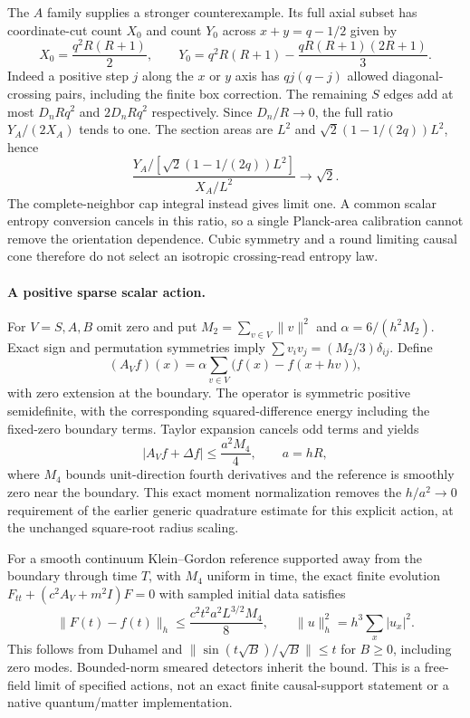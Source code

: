 The $A$ family supplies a stronger counterexample. Its full axial subset has
coordinate-cut count $X_0$ and count $Y_0$ across $x+y=q-1/2$ given by
\[
 X_0=\frac{q^2R(R+1)}2,\qquad
 Y_0=q^2R(R+1)-\frac{qR(R+1)(2R+1)}3.
\]
Indeed a positive step $j$ along the $x$ or $y$ axis has $qj(q-j)$ allowed
diagonal-crossing pairs, including the finite box correction. The remaining
$S$ edges add at most $D_nRq^2$ and $2D_nRq^2$ respectively. Since
$D_n/R\to0$, the full ratio $Y_A/(2X_A)$ tends to one. The section areas
are $L^2$ and $\sqrt2(1-1/(2q))L^2$, hence
\begin{equation}
 \frac{Y_A/[\sqrt2(1-1/(2q))L^2]}{X_A/L^2}\longrightarrow\sqrt2.
 \label{eq:m1-cut-anisotropy}
\end{equation}
The complete-neighbor cap integral instead gives limit one. A common scalar
entropy conversion cancels in this ratio, so a single Planck-area calibration
cannot remove the orientation dependence. Cubic symmetry and a round limiting
causal cone therefore do not select an isotropic crossing-read entropy law.

\paragraph{A positive sparse scalar action.}
For $V=S,A,B$ omit zero and put $M_2=\sum_{v\in V}\|v\|^2$ and
$\alpha=6/(h^2M_2)$. Exact sign and permutation symmetries imply
$\sum v_iv_j=(M_2/3)\delta_{ij}$. Define
\[
 (A_V f)(x)=\alpha\sum_{v\in V}\bigl(f(x)-f(x+hv)\bigr),
\]
with zero extension at the boundary. The operator is symmetric positive
semidefinite, with the corresponding squared-difference energy including
the fixed-zero boundary terms. Taylor expansion cancels odd terms and yields
\[
 |A_V f+\Delta f|\le\frac{a^2M_4}{4},\qquad a=hR,
\]
where $M_4$ bounds unit-direction fourth derivatives and the reference is
smoothly zero near the boundary. This exact moment normalization removes the
$h/a^2\to0$ requirement of the earlier generic quadrature estimate for this
explicit action, at the unchanged square-root radius scaling.

For a smooth continuum Klein--Gordon reference supported away from the
boundary through time $T$, with $M_4$ uniform in time, the exact finite evolution
$F_{tt}+(c^2A_V+m^2I)F=0$ with sampled initial data satisfies
\[
 \|F(t)-f(t)\|_h\le
 \frac{c^2t^2a^2L^{3/2}M_4}{8},\qquad
 \|u\|_h^2=h^3\sum_x|u_x|^2.
\]
This follows from Duhamel and
$\|\sin(t\sqrt B)/\sqrt B\|\le t$ for $B\ge0$, including zero modes.
Bounded-norm smeared detectors inherit the bound. This is a free-field
limit of specified actions, not an exact finite causal-support statement
or a native quantum/matter implementation.

